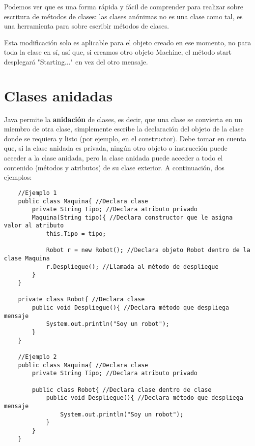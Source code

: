 Podemos ver que es una forma rápida y fácil de comprender para realizar sobre escritura de métodos de clases: las clases anónimas no es una clase como tal, es una herramienta para sobre escribir métodos de clases.

Esta modificación solo es aplicable para el objeto creado en ese momento, no para toda la clase en sí, así que, si creamos otro objeto Machine, el método start desplegará "Starting..." en vez del otro mensaje.



\section{Clases anidadas}
\hspace{0.55cm}Java permite la \textbf{anidación} de clases, es decir, que una clase se convierta en un miembro de otra clase, simplemente escribe la declaración del objeto de la clase donde se requiera y listo (por ejemplo, en el constructor). Debe tomar en cuenta que, si la clase anidada es privada, ningún otro objeto o instrucción puede acceder a la clase anidada, pero la clase anidada puede acceder a todo el contenido (métodos y atributos) de su clase exterior. A continuación, dos ejemplos:
\begin{lstlisting}
    //Ejemplo 1
    public class Maquina{ //Declara clase
        private String Tipo; //Declara atributo privado
        Maquina(String tipo){ //Declara constructor que le asigna valor al atributo
            this.Tipo = tipo;
            
            Robot r = new Robot(); //Declara objeto Robot dentro de la clase Maquina
            r.Despliegue(); //Llamada al método de despliegue
        }
    }
    
    private class Robot{ //Declara clase
        public void Despliegue(){ //Declara método que despliega mensaje
            System.out.println("Soy un robot");
        }
    }
    
    //Ejemplo 2
    public class Maquina{ //Declara clase
        private String Tipo; //Declara atributo privado
        
        public class Robot{ //Declara clase dentro de clase
            public void Despliegue(){ //Declara método que despliega mensaje
                System.out.println("Soy un robot");
            }
        }
    }
\end{lstlisting}